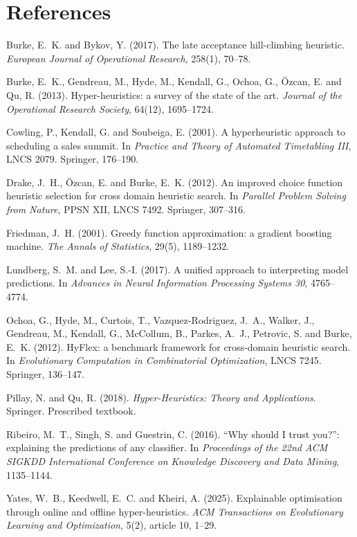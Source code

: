 \documentclass[11pt,a4paper]{article}
\begin{document}
\section*{References}

\begin{description}
\setlength\itemsep{0pt}
\item Burke, E.~K. and Bykov, Y. (2017). The late acceptance hill-climbing
heuristic. \textit{European Journal of Operational Research}, 258(1), 70--78.

\item Burke, E.~K., Gendreau, M., Hyde, M., Kendall, G., Ochoa, G., \"{O}zcan,
E. and Qu, R. (2013). Hyper-heuristics: a survey of the state of the art.
\textit{Journal of the Operational Research Society}, 64(12), 1695--1724.

\item Cowling, P., Kendall, G. and Soubeiga, E. (2001). A hyperheuristic approach
to scheduling a sales summit. In \textit{Practice and Theory of Automated
Timetabling III}, LNCS 2079. Springer, 176--190.

\item Drake, J.~H., \"{O}zcan, E. and Burke, E.~K. (2012). An improved choice
function heuristic selection for cross domain heuristic search. In \textit{Parallel
Problem Solving from Nature}, PPSN XII, LNCS 7492. Springer, 307--316.

\item Friedman, J.~H. (2001). Greedy function approximation: a gradient boosting
machine. \textit{The Annals of Statistics}, 29(5), 1189--1232.

\item Lundberg, S.~M. and Lee, S.-I. (2017). A unified approach to interpreting
model predictions. In \textit{Advances in Neural Information Processing Systems
30}, 4765--4774.

\item Ochoa, G., Hyde, M., Curtois, T., Vazquez-Rodriguez, J.~A., Walker, J.,
Gendreau, M., Kendall, G., McCollum, B., Parkes, A.~J., Petrovic, S. and Burke,
E.~K. (2012). HyFlex: a benchmark framework for cross-domain heuristic search. In
\textit{Evolutionary Computation in Combinatorial Optimization}, LNCS 7245. Springer,
136--147.

\item Pillay, N. and Qu, R. (2018). \textit{Hyper-Heuristics: Theory and
Applications}. Springer. Prescribed textbook.

\item Ribeiro, M.~T., Singh, S. and Guestrin, C. (2016). ``Why should I trust
you?'': explaining the predictions of any classifier. In \textit{Proceedings of the
22nd ACM SIGKDD International Conference on Knowledge Discovery and Data Mining},
1135--1144.

\item Yates, W.~B., Keedwell, E.~C. and Kheiri, A. (2025). Explainable
optimisation through online and offline hyper-heuristics. \textit{ACM Transactions
on Evolutionary Learning and Optimization}, 5(2), article 10, 1--29.
\end{description}
\end{document}
